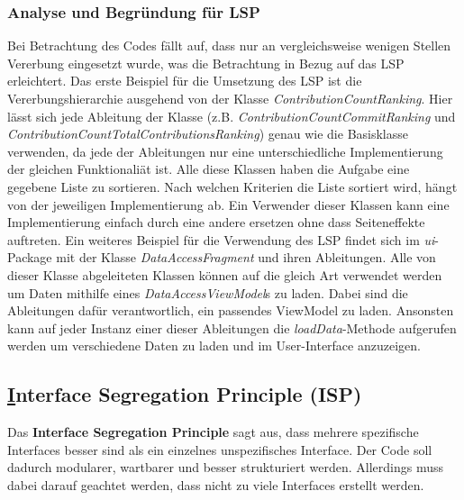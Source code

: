 \subsubsection{Analyse und Begründung für LSP}
Bei Betrachtung des Codes fällt auf, dass nur an vergleichsweise wenigen Stellen Vererbung eingesetzt wurde, was die Betrachtung in Bezug auf das LSP erleichtert.
Das erste Beispiel für die Umsetzung des LSP ist die Vererbungshierarchie ausgehend von der Klasse \textit{ContributionCountRanking}.
Hier lässt sich jede Ableitung der Klasse (z.B. \textit{ContributionCountCommitRanking} und \textit{ContributionCountTotalContributionsRanking}) genau wie die Basisklasse verwenden, da jede der Ableitungen nur eine unterschiedliche Implementierung der gleichen Funktionaliät ist.
Alle diese Klassen haben die Aufgabe eine gegebene Liste zu sortieren.
Nach welchen Kriterien die Liste sortiert wird, hängt von der jeweiligen Implementierung ab.
Ein Verwender dieser Klassen kann eine Implementierung einfach durch eine andere ersetzen ohne dass Seiteneffekte auftreten.
\newline
Ein weiteres Beispiel für die Verwendung des LSP findet sich im \textit{ui}-Package mit der Klasse \textit{DataAccessFragment} und ihren Ableitungen.
Alle von dieser Klasse abgeleiteten Klassen können auf die gleich Art verwendet werden um Daten mithilfe eines \textit{DataAccessViewModel}s zu laden.
Dabei sind die Ableitungen dafür verantwortlich, ein passendes ViewModel zu laden.
Ansonsten kann auf jeder Instanz einer dieser Ableitungen die \textit{loadData}-Methode aufgerufen werden um verschiedene Daten zu laden und im User-Interface anzuzeigen.


\newpage
\subsection{\underline{I}nterface Segregation Principle (ISP)}
\label{sec:ISP}

Das \textbf{Interface Segregation Principle} sagt aus, dass mehrere spezifische Interfaces besser sind als ein einzelnes unspezifisches Interface.
Der Code soll dadurch modularer, wartbarer und besser strukturiert werden. 
Allerdings muss dabei darauf geachtet werden, dass nicht zu viele Interfaces erstellt werden.


